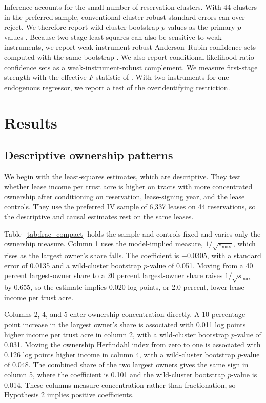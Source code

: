 \documentclass[12pt]{article}
\begin{document}
Inference accounts for the small number of reservation clusters. With 44 clusters in the preferred sample, conventional cluster-robust standard errors can over-reject. We therefore report wild-cluster bootstrap $p$-values as the primary $p$-values \citep{CameronGelbachMiller2008}. Because two-stage least squares can also be sensitive to weak instruments, we report weak-instrument-robust Anderson--Rubin confidence sets computed with the same bootstrap \citep{AndersonRubin1949}. We also report conditional likelihood ratio confidence sets as a weak-instrument-robust complement. We measure first-stage strength with the effective $F$-statistic of \citet{MontielOleaPflueger2013}. With two instruments for one endogenous regressor, we report a test of the overidentifying restriction.

\section{Results} \label{Results}
\subsection{Descriptive ownership patterns}

We begin with the least-squares estimates, which are descriptive. They test whether lease income per trust acre is higher on tracts with more concentrated ownership after conditioning on reservation, lease-signing year, and the lease controls. They use the preferred IV sample of 6,337 leases on 44 reservations, so the descriptive and causal estimates rest on the same leases.

Table~\ref{tab:frac_compact} holds the sample and controls fixed and varies only the ownership measure. Column 1 uses the model-implied measure, $1/\sqrt{s_{\max}}$, which rises as the largest owner's share falls. The coefficient is $-0.0305$, with a standard error of 0.0135 and a wild-cluster bootstrap $p$-value of 0.051. Moving from a 40 percent largest-owner share to a 20 percent largest-owner share raises $1/\sqrt{s_{\max}}$ by 0.655, so the estimate implies 0.020 log points, or 2.0 percent, lower lease income per trust acre.

Columns 2, 4, and 5 enter ownership concentration directly. A 10-percentage-point increase in the largest owner's share is associated with 0.011 log points higher income per trust acre in column 2, with a wild-cluster bootstrap $p$-value of 0.031. Moving the ownership Herfindahl index from zero to one is associated with 0.126 log points higher income in column 4, with a wild-cluster bootstrap $p$-value of 0.048. The combined share of the two largest owners gives the same sign in column 5, where the coefficient is 0.101 and the wild-cluster bootstrap $p$-value is 0.014. These columns measure concentration rather than fractionation, so Hypothesis 2 implies positive coefficients.
\end{document}

